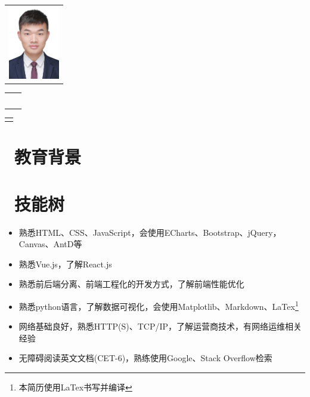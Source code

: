 \documentclass[14pt]{resume}
\begin{document}

\begin{multicols}{4}
    \Large{
        \begin{tabu}{ r }
        \end{tabu}
    }
    \columnbreak
    \Large{
        \begin{tabu}{ l l }
            &  \\
            &  \\
            &  \\
            &  \\
            &  
        \end{tabu}
    }
    \columnbreak
    \Large{
        \begin{tabu}{ r }
        \end{tabu}
    }
\end{multicols}

\section{\faGraduationCap\  教育背景}

\section{\faCogs\ 技能树}

\begin{itemize}
    \item[\faTree] 熟悉HTML、CSS、JavaScript，会使用ECharts、Bootstrap、jQuery，Canvas、AntD等
    \item[\faTree] 熟悉Vue.js，了解React.js
    \item[\faTree] 熟悉前后端分离、前端工程化的开发方式，了解前端性能优化
    \item[\faTree] 熟悉python语言，了解数据可视化，会使用Matplotlib、Markdown、LaTex\footnote{本简历使用LaTex书写并编译}
    \item[\faTree] 网络基础良好，熟悉HTTP(S)、TCP/IP，了解运营商技术，有网络运维相关经验
    \item[\faTree] 无障碍阅读英文文档(CET-6)，熟练使用Google、Stack Overflow检索
\end{itemize}
\end{document}
